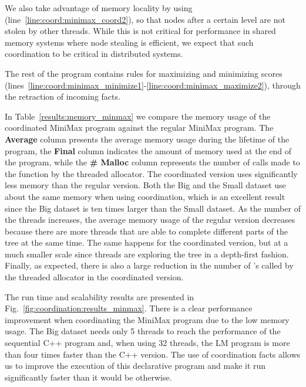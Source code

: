 We also take advantage of memory locality by using 
(line~\ref{line:coord:minimax_coord2}), so that nodes after a certain level are
not stolen by other threads. While this is not critical for performance in
shared memory systems where node stealing is efficient, we expect that such
coordination to be critical in distributed systems.

The rest of the program contains rules for maximizing and minimizing scores
(lines~\ref{line:coord:minimax_minimize1}-\ref{line:coord:minimax_maximize2}),
through the retraction of  incoming facts.

\begin{table}[ht]
   \begin{center}
      
   \end{center}

   \label{results:memory_minmax}
\end{table}

In Table~\ref{results:memory_minmax} we compare the memory usage of the
coordinated MiniMax program against the regular MiniMax program. The
\textbf{Average} column presents the average memory usage during the lifetime of
the program, the \textbf{Final} column indicates the amount of memory used at
the end of the program, while the \textbf{\# Malloc} column represents the
number of calls made to the  function by the threaded allocator.
The coordinated version uses significantly less memory than the regular version.
Both the Big and the Small dataset use about the same memory when using
coordination, which is an excellent result since the Big dataset is ten times
larger than the Small dataset.  As the number of the threads increases, the
average memory usage of the regular version decreases because there are more
threads that are able to complete different parts of the tree at the same time.
The same happens for the coordinated version, but at a much smaller scale since
threads are exploring the tree in a depth-first fashion. Finally, as expected,
there is also a large reduction in the number of 's called by the
threaded allocator in the coordinated version.

The run time and scalability results are presented in
Fig.~\ref{fig:coordination:results_minmax}. There is a clear performance
improvement when coordinating the MiniMax program due to the low memory usage.
The Big dataset needs only 5 threads to reach the performance of the
sequential C++ program and, when using 32 threads, the LM program is more than
four times faster than the C++ version. The use of coordination facts allows us
to improve the execution of this declarative program and make it run
significantly faster than it would be otherwise.

